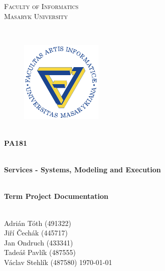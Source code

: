 \documentclass[11pt,a4paper]{article}
\begin{document}
\begin{titlepage}

    \begin{center}
        \vfill {%
            \Huge{%
                \textsc{%
                    Faculty of Informatics\\[3mm]%
                    Masaryk University%
                }%
            }%
        }%

        \hfill\\[15mm]

        \begin{figure}[!h]
            \centering
            \includegraphics[scale=3]{doc/img/muni-fi-logo.pdf}
        \end{figure}

        \hfill\\[10mm]

        \Huge{
            \textbf{
                PA181
            }
        }

        \hfill\\[-10mm]

        \huge{
            \textbf{
                Services - Systems, Modeling and Execution
            }
        }

        \hfill\\[10mm]

        \LARGE{
            \textbf{
                Term Project Documentation
            }
        }
        \vfill

    \end{center}

        \Large{
            \hfill\\
            Adrián Tóth (491322)\\
            Jiří Čechák (445717)\\
            Jan Ondruch (433341)\\
            Tadeáš Pavlík (487555)\\
            Václav Stehlík (487580) \hfill \today
        }

\end{titlepage}
\end{document}
